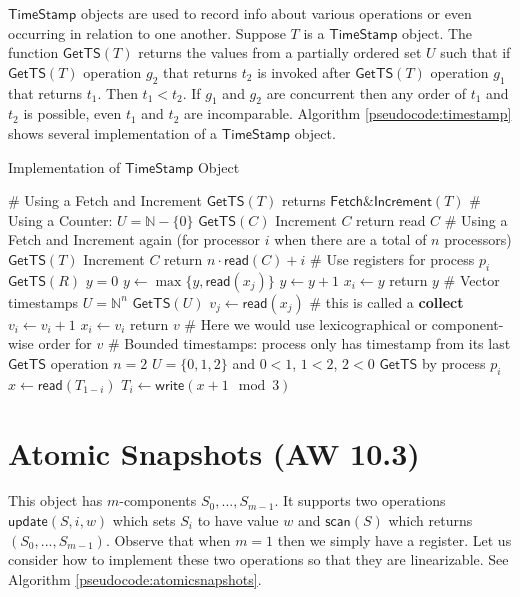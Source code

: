 \documentclass[twoside]{article}
\newcommand\readF{\mathsf{read}}
\newcommand\writeF{\mathsf{write}}
\newcommand\timestamp{\mathsf{TimeStamp}}
\newcommand\GetTS{\mathsf{GetTS}}
\newcommand\N{\mathbb{N}}
\newcommand\updateF{\mathsf{update}}
\newcommand\scanF{\mathsf{scan}}
\begin{document}
$\timestamp$ objects are used to record info about various operations or even occurring in relation to one another. Suppose $T$ is a $\timestamp$ object. The function $\mathsf{GetTS}(T)$ returns the values from a partially ordered set $U$ such that if $\GetTS(T)$ operation $g_2$ that returns $t_2$ is invoked after $\GetTS(T)$ operation $g_1$ that returns $t_1$. Then $t_1 < t_2$. If $g_1$ and $g_2$ are concurrent then any order of $t_1$ and $t_2$ is possible, even $t_1$ and $t_2$ are incomparable. Algorithm \ref{pseudocode:timestamp} shows several implementation of a $\timestamp$ object.
\begin{algorithm}
	\caption{Implementation of $\timestamp$ Object}
    \label{pseudocode:timestamp}
    \begin{algorithmic}[1]
	\State \# Using a Fetch and Increment
	\State $\GetTS(T)$
	\State returns $\mathsf{Fetch\&Increment}(T)$
	\State
	\State \# Using a Counter: $U = \N - \{0\}$
	\State $\GetTS(C)$
	\State Increment $C$
	\State return read $C$
	\State
	\State \# Using a Fetch and Increment again (for processor $i$ when there are a total of $n$ processors) 
	\State $\GetTS(T)$
	\State Increment $C$
	\State return $n \cdot \readF(C) + i$
	\State
	\State \# Use registers for process $p_i$
	\State $\GetTS(R)$
	\State $y = 0$
		\State $y \leftarrow \max\{y, \readF(x_j)\}$
	\EndFor
	\State $y \leftarrow y + 1$
	\State $x_i \leftarrow y$
	\State return $y$
	\State
	\State \# Vector timestamps $U = \N^n$
	\State $\GetTS(U)$	
		\State $v_j \leftarrow \readF(x_j)$ \# this is called a \textbf{collect}
	\EndFor
	\State $v_i \leftarrow v_i + 1$
	\State $x_i \leftarrow v_i$
	\State return $v$
	\State \# Here we would use lexicographical or component-wise order for $v$
	\State
	\State \# Bounded timestamps: process only has timestamp from its last $\GetTS$ operation
	\State $n = 2$
	\State $U = \{0, 1, 2\}$ and $0 < 1$, $1 < 2$, $2 < 0$
	\State $\GetTS$ by process $p_i$
	\State $x \leftarrow \readF(T_{1-i})$
	\State $T_i \leftarrow \writeF(x + 1 \mod 3)$
    \end{algorithmic}
\end{algorithm}

\section{Atomic Snapshots (AW 10.3)}
This object has $m$-components $S_0, ..., S_{m-1}$. It supports two operations $\updateF(S, i, w)$ which sets $S_i$ to have value $w$ and $\scanF(S)$ which returns $(S_0, ..., S_{m-1})$. Observe that when $m = 1$ then we simply have a register. Let us consider how to implement these two operations so that they are linearizable. See Algorithm  \ref{pseudocode:atomicsnapshots}. 
\end{document}
